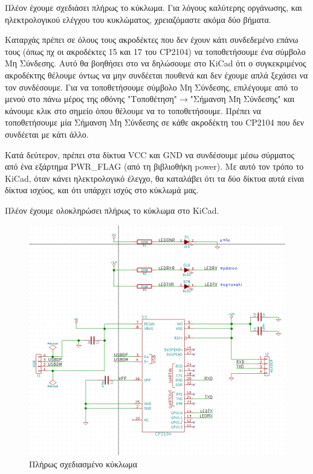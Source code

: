 \documentclass[a4paper]{article}
\begin{document}
Πλέον έχουμε σχεδιάσει πλήρως το κύκλωμα. Για λόγους καλύτερης οργάνωσης, και ηλεκτρολογικού ελέγχου του κυκλώματος, χρειαζόμαστε ακόμα δύο βήματα.

Καταρχάς πρέπει σε όλους τους ακροδέκτες που δεν έχουν κάτι συνδεδεμένο επάνω τους (όπως πχ οι ακροδέκτες 15 και 17 του CP2104) να τοποθετήσουμε ένα σύμβολο Μη Σύνδεσης. Αυτό θα βοηθήσει στο να δηλώσουμε στο KiCad ότι ο συγκεκριμένος ακροδέκτης θέλουμε όντως να μην συνδέεται πουθενά και δεν έχουμε απλά ξεχάσει να τον συνδέσουμε. Για να τοποθετήσουμε σύμβολο Μη Σύνδεσης, επιλέγουμε από το μενού στο πάνω μέρος της οθόνης "Τοποθέτηση"$\rightarrow$"Σήμανση Μη Σύνδεσης" και κάνουμε κλικ στο σημείο όπου θέλουμε να το τοποθετήσουμε. Πρέπει να τοποθετήσουμε μία Σήμανση Μη Σύνδεσης σε κάθε ακροδέκτη του CP2104 που δεν συνδέεται με κάτι άλλο.

Κατά δεύτερον, πρέπει στα δίκτυα VCC και GND να συνδέσουμε μέσω σύρματος από ένα εξάρτημα PWR\_FLAG (από τη βιβλιοθήκη power). Με αυτό τον τρόπο το KiCad, όταν κάνει ηλεκτρολογικό έλεγχο, θα καταλάβει ότι τα δύο δίκτυα αυτά είναι δίκτυα ισχύος, και ότι υπάρχει ισχύς στο κύκλωμά μας.

Πλέον έχουμε ολοκληρώσει πλήρως το κύκλωμα στο KiCad.

\begin{figure}
  \begin{center}
    \includegraphics{img/final-schem.png}
    \caption{Πλήρως σχεδιασμένο κύκλωμα}
    \label{fig:final-schem}
  \end{center}
\end{figure}
\end{document}
